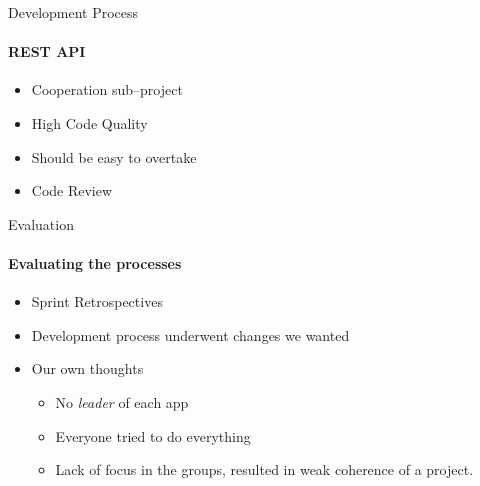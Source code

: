 		\begin{frame}[t]{Development Process}\framesubtitle{REST API}
    \begin{itemize}
        \item Cooperation sub--project
        \item High Code Quality
        \item Should be easy to overtake
        \item Code Review
    \end{itemize}
	\end{frame}

		\begin{frame}[t]{Evaluation}\framesubtitle{Evaluating the processes}
    \begin{itemize}
        \item Sprint Retrospectives
        \item Development process underwent changes we wanted
        \item Our own thoughts
        	\begin{itemize}
        		\item No \textit{leader} of each app
        		\item Everyone tried to do everything
        		\item Lack of focus in the groups, resulted in weak coherence of a project.
        	\end{itemize}
    \end{itemize}
	\end{frame}